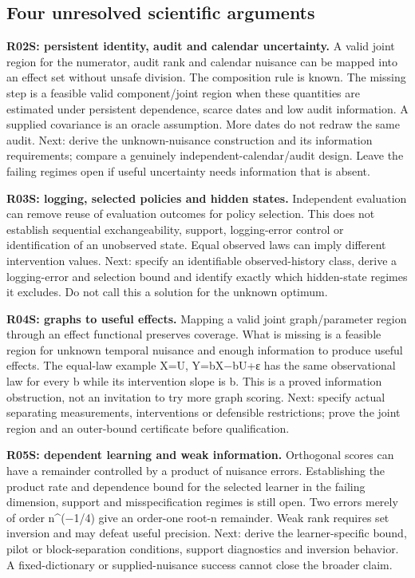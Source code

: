 \documentclass[
  10pt,
]{article}
\begin{document}
\hypertarget{four-unresolved-scientific-arguments}{%
\subsection{Four unresolved scientific
arguments}\label{four-unresolved-scientific-arguments}}

\textbf{R02S: persistent identity, audit and calendar uncertainty.} A
valid joint region for the numerator, audit rank and calendar nuisance
can be mapped into an effect set without unsafe division. The
composition rule is known. The missing step is a feasible valid
component/joint region when these quantities are estimated under
persistent dependence, scarce dates and low audit information. A
supplied covariance is an oracle assumption. More dates do not redraw
the same audit. Next: derive the unknown-nuisance construction and its
information requirements; compare a genuinely independent-calendar/audit
design. Leave the failing regimes open if useful uncertainty needs
information that is absent.

\textbf{R03S: logging, selected policies and hidden states.} Independent
evaluation can remove reuse of evaluation outcomes for policy selection.
This does not establish sequential exchangeability, support,
logging-error control or identification of an unobserved state. Equal
observed laws can imply different intervention values. Next: specify an
identifiable observed-history class, derive a logging-error and
selection bound and identify exactly which hidden-state regimes it
excludes. Do not call this a solution for the unknown optimum.

\textbf{R04S: graphs to useful effects.} Mapping a valid joint
graph/parameter region through an effect functional preserves coverage.
What is missing is a feasible region for unknown temporal nuisance and
enough information to produce useful effects. The equal-law example X=U,
Y=bX−bU+ε has the same observational law for every b while its
intervention slope is b. This is a proved information obstruction, not
an invitation to try more graph scoring. Next: specify actual separating
measurements, interventions or defensible restrictions; prove the joint
region and an outer-bound certificate before qualification.

\textbf{R05S: dependent learning and weak information.} Orthogonal
scores can have a remainder controlled by a product of nuisance errors.
Establishing the product rate and dependence bound for the selected
learner in the failing dimension, support and misspecification regimes
is still open. Two errors merely of order n\^{}(−1/4) give an order-one
root-n remainder. Weak rank requires set inversion and may defeat useful
precision. Next: derive the learner-specific bound, pilot or
block-separation conditions, support diagnostics and inversion behavior.
A fixed-dictionary or supplied-nuisance success cannot close the broader
claim.
\end{document}
